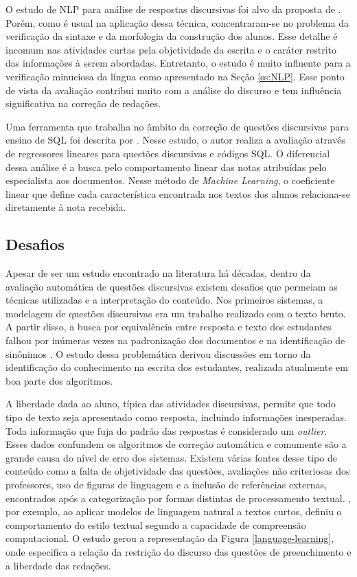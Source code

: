 O estudo de NLP para análise de respostas discursivas foi alvo da proposta de . Porém, como é usual na aplicação dessa técnica, concentraram-se no problema da verificação da sintaxe e da morfologia da construção dos alunos. Esse detalhe é incomum nas atividades curtas pela objetividade da escrita e o caráter restrito  das informações à serem abordadas. Entretanto, o estudo é muito influente para a verificação minuciosa da língua como apresentado na Seção \ref{ss:NLP}. Esse ponto de vista da avaliação contribui muito com a análise do discurso e tem influência significativa na correção de redações. 

Uma ferramenta que trabalha no âmbito da correção de questões discursivas para ensino de SQL foi descrita por . Nesse estudo, o autor realiza a avaliação através de regressores lineares para questões discursivas e códigos SQL. O diferencial dessa análise é a busca pelo comportamento linear das notas atribuídas pelo especialista aos documentos. Nesse método de \textit{Machine Learning}, o coeficiente linear que define cada característica encontrada nos textos dos alunos relaciona-se diretamente à nota recebida.

\subsection{Desafios}
Apesar de ser um estudo encontrado na literatura há décadas, dentro da avaliação automática de questões discursivas existem desafios que permeiam as técnicas utilizadas e a interpretação do conteúdo. Nos primeiros sistemas, a modelagem de questões discursivas era um trabalho realizado com o texto bruto. A partir disso, a busca por equivalência entre resposta e texto dos estudantes falhou por inúmeras vezes na padronização dos documentos e na identificação de sinônimos \cite{leffa2003}. O estudo dessa problemática derivou discussões em torno da identificação do conhecimento na escrita dos estudantes, realizada atualmente em boa parte dos algoritmos. 

A liberdade dada ao aluno, típica das atividades discursivas, permite que todo tipo de texto seja apresentado como resposta, incluindo informações inesperadas. Toda informação que fuja do padrão das respostas é considerado um \textit{outlier}. Esses dados confundem os algoritmos de correção automática e comumente são a grande causa do nível de erro dos sistemas. Existem várias fontes desse tipo de conteúdo como a falta de objetividade das questões, avaliações não criteriosas dos professores, uso de figuras de linguagem e a inclusão de referências externas, encontrados após a categorização por formas distintas de processamento textual. , por exemplo, ao aplicar modelos de linguagem natural a textos curtos, definiu o comportamento do estilo textual segundo a capacidade de compreensão computacional. O estudo gerou a representação da Figura \ref{language-learning}, onde especifica a relação da restrição do discurso das questões de preenchimento e a liberdade das redações.

